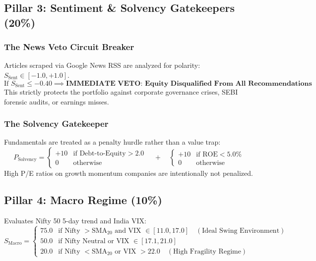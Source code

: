 \documentclass[11pt,a4paper]{article}
\begin{document}
\subsection{Pillar 3: Sentiment \& Solvency Gatekeepers (20\%)}
\subsubsection{The News Veto Circuit Breaker}
Articles scraped via Google News RSS are analyzed for polarity: $S_{\text{Sent}} \in [-1.0, +1.0]$.
\begin{equation}
\text{If } S_{\text{Sent}} \le -0.40 \implies \textbf{IMMEDIATE VETO: Equity Disqualified From All Recommendations}
\end{equation}
This strictly protects the portfolio against corporate governance crises, SEBI forensic audits, or earnings misses.

\subsubsection{The Solvency Gatekeeper}
Fundamentals are treated as a penalty hurdle rather than a value trap:
\begin{equation}
P_{\text{Solvency}} = \begin{cases} +10 & \text{if } \text{Debt-to-Equity} > 2.0 \\ 0 & \text{otherwise} \end{cases} \quad + \quad \begin{cases} +10 & \text{if } \text{ROE} < 5.0\% \\ 0 & \text{otherwise} \end{cases}
\end{equation}
High P/E ratios on growth momentum companies are intentionally not penalized.

\subsection{Pillar 4: Macro Regime (10\%)}
Evaluates Nifty 50 5-day trend and India VIX:
\begin{equation}
S_{\text{Macro}} = \begin{cases}
75.0 & \text{if Nifty } > \text{SMA}_{20} \text{ and VIX } \in [11.0, 17.0] \quad (\text{Ideal Swing Environment}) \\
50.0 & \text{if Nifty Neutral or VIX } \in [17.1, 21.0] \\
20.0 & \text{if Nifty } < \text{SMA}_{20} \text{ or VIX } > 22.0 \quad (\text{High Fragility Regime})
\end{cases}
\end{equation}
\end{document}

